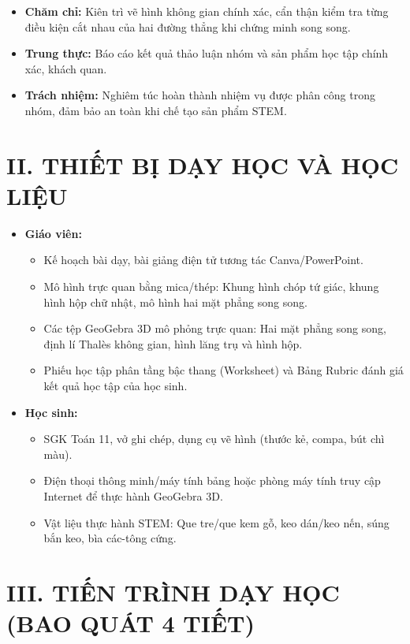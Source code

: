 \documentclass[12pt, a4paper]{article}
\begin{document}
\begin{itemize}[leftmargin=1.2cm]
    \item \textbf{Chăm chỉ:} Kiên trì vẽ hình không gian chính xác, cẩn thận kiểm tra từng điều kiện cắt nhau của hai đường thẳng khi chứng minh song song.
    \item \textbf{Trung thực:} Báo cáo kết quả thảo luận nhóm và sản phẩm học tập chính xác, khách quan.
    \item \textbf{Trách nhiệm:} Nghiêm túc hoàn thành nhiệm vụ được phân công trong nhóm, đảm bảo an toàn khi chế tạo sản phẩm STEM.
\end{itemize}

\section*{II. THIẾT BỊ DẠY HỌC VÀ HỌC LIỆU}

\begin{itemize}[leftmargin=1.2cm]
    \item \textbf{Giáo viên:}
    \begin{itemize}[leftmargin=0.6cm]
        \item Kế hoạch bài dạy, bài giảng điện tử tương tác Canva/PowerPoint.
        \item Mô hình trực quan bằng mica/thép: Khung hình chóp tứ giác, khung hình hộp chữ nhật, mô hình hai mặt phẳng song song.
        \item Các tệp GeoGebra 3D mô phỏng trực quan: Hai mặt phẳng song song, định lí Thalès không gian, hình lăng trụ và hình hộp.
        \item Phiếu học tập phân tầng bậc thang (Worksheet) và Bảng Rubric đánh giá kết quả học tập của học sinh.
    \end{itemize}
    \item \textbf{Học sinh:}
    \begin{itemize}[leftmargin=0.6cm]
        \item SGK Toán 11, vở ghi chép, dụng cụ vẽ hình (thước kẻ, compa, bút chì màu).
        \item Điện thoại thông minh/máy tính bảng hoặc phòng máy tính truy cập Internet để thực hành GeoGebra 3D.
        \item Vật liệu thực hành STEM: Que tre/que kem gỗ, keo dán/keo nến, súng bắn keo, bìa các-tông cứng.
    \end{itemize}
\end{itemize}

\section*{III. TIẾN TRÌNH DẠY HỌC (BAO QUÁT 4 TIẾT)}
\end{document}
